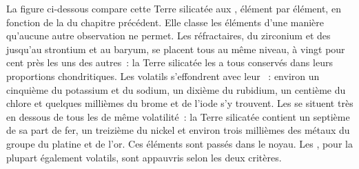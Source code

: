 La figure ci-dessous compare cette Terre silicatée aux , élément par élément,
en fonction de la  du chapitre précédent. Elle classe les
éléments d'une manière qu'aucune autre observation ne permet. Les 
réfractaires, du zirconium et des  jusqu'au strontium et au baryum, se placent
tous au même niveau, à vingt pour cent près les uns des autres~: la Terre silicatée
les a tous conservés dans leurs proportions chondritiques. Les 
volatils s'effondrent avec leur ~: environ un cinquième du potassium
et du sodium, un dixième du rubidium, un centième du chlore et quelques millièmes
du brome et de l'iode s'y trouvent. Les  se situent très en dessous
de tous les  de même volatilité~: la Terre silicatée contient un
septième de sa part de fer, un treizième du nickel et environ trois millièmes des métaux
du groupe du platine et de l'or. Ces éléments sont passés dans le noyau. Les , pour la plupart également volatils, sont appauvris selon les deux critères.

